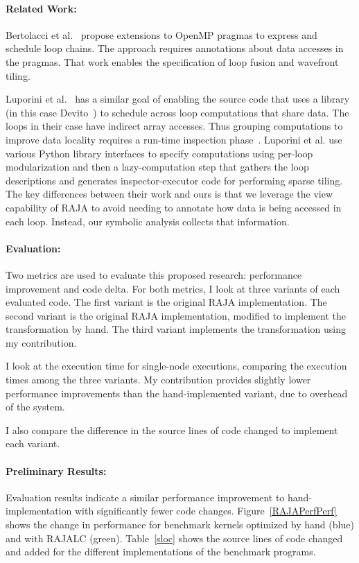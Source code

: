 \documentclass{article}
\begin{document}
\paragraph{Related Work:}

Bertolacci et al.~\cite{Bertolacci2016,Bertolacci2019} propose extensions to
OpenMP pragmas to express and schedule loop chains.
The approach requires annotations about data accesses in the pragmas.
That work enables the specification of loop fusion and wavefront tiling. 

Luporini et al.~\cite{Luporini2019} has a similar goal of enabling the source
code that uses a library  (in this case Devito~\cite{Luporini2018}) to
schedule across loop computations that share data.
The loops in their case have indirect array accesses.
Thus grouping computations to improve data locality requires a run-time
inspection phase~\cite{Strout14IPDPS}.
Luporini et al. use various Python library interfaces to specify computations
using per-loop modularization and then a lazy-computation step that gathers
the loop descriptions and generates inspector-executor code for performing 
sparse tiling.
The key differences between their work and ours is that we leverage the view 
capability of RAJA to avoid needing to annotate how data is being accessed
in each loop.  
Instead, our symbolic analysis collects that information.

\paragraph{Evaluation:}

Two metrics are used to evaluate this proposed research: performance improvement and code delta. 
For both metrics, I look at three variants of each evaluated code.
The first variant is the original RAJA implementation. 
The second variant is the original RAJA implementation, modified to implement the transformation by hand.
The third variant implements the transformation using my contribution.

I look at the execution time for single-node executions, comparing the execution times among the three variants. My contribution provides slightly lower performance improvements than the hand-implemented variant, due to overhead of the system.

I also compare the difference in the source lines of code changed to implement each variant.

\paragraph{Preliminary Results:}
Evaluation results indicate a similar performance improvement to hand-implementation with significantly fewer code changes.
Figure~\ref{RAJAPerfPerf} shows the change in performance for benchmark kernels optimized by hand (blue) and with RAJALC (green). 
Table~\ref{sloc} shows the source lines of code changed and added for the different implementations of the benchmark programs.
\end{document}
